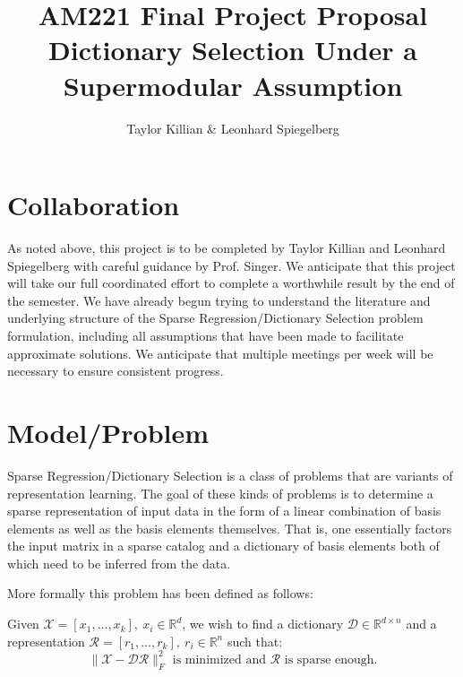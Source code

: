 \documentclass{article}
\newcommand{\R}{\mathbb{R}}
\begin{document}
\title{AM221 Final Project Proposal \\ \large Dictionary Selection Under a Supermodular Assumption}
\author{Taylor Killian \& Leonhard Spiegelberg}
\maketitle

%

\section{Collaboration}\label{partnership}
As noted above, this project is to be completed by Taylor Killian and Leonhard Spiegelberg with careful guidance by Prof. Singer. We anticipate that this project will take our full coordinated effort to complete a worthwhile result by the end of the semester. We have already begun trying to understand the literature and underlying structure of the Sparse Regression/Dictionary Selection problem formulation, including all assumptions that have been made to facilitate approximate solutions. We anticipate that multiple meetings per week will be necessary to ensure consistent progress. 

\section{Model/Problem} \label{model}
Sparse Regression/Dictionary Selection is a class of problems that are variants of representation learning. The goal of these kinds of problems is to determine a sparse representation of input data in the form of a linear combination of basis elements as well as the basis elements themselves. That is, one essentially factors the input matrix in a sparse catalog and a dictionary of basis elements both of which need to be inferred from the data.
\newline

\noindent More formally this problem has been defined as follows:
\newline

Given $\mathcal{X} = [x_1,\dots , x_k], \ x_i\in\R^d$, we wish to find a dictionary $\mathcal{D}\in\R^{d \times n}$ and a representation $\mathcal{R} = [r_1, \dots, r_k], \ r_i\in\R^n$ such that: $$\|\mathcal{X}-\mathcal{D}\mathcal{R}\|_F^2 \text{ is minimized and } \mathcal{R} \text{ is sparse enough.}$$
\end{document}
